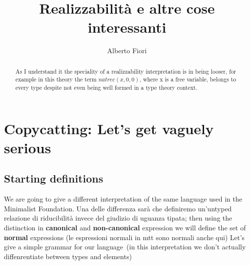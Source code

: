 \documentclass[11pt,a5paper,draft,oneside]{amsbook}
\author{Alberto Fiori}
\title{Realizzabilità e altre cose interessanti}
\newcommand{\femph}{\textbf}
\begin{document}
\maketitle
\begin{abstract}
	As I understand it the speciality of a 
	realizzability 	interpretation is in 
	being looser, for example in this theory
	the term $natrec(x, 0, 0)$, where x is a free variable, belongs to every type despite not even being well formed in a type theory context. 
\end{abstract}

\section{Copycatting: Let's get vaguely serious}
	\subsection{Starting definitions}
		We are going to give a different interpretation 
		of the same language used in the Minimalist 
		Foundation. Una delle differenza sarà che definiremo
		un'untyped relazione di riducibilità invece 
		del giudizio di uguanza tipata; then using the distinction in \femph{canonical} and \femph{non-canonical} expression we will define the set of \femph{normal} expressions (le espressioni normali in mtt sono normali anche qui)
		Let's give a simple grammar for our language~(in this interpretation we don't actually diffenrentiate between types and elements)
		\
		  
\end{document}
